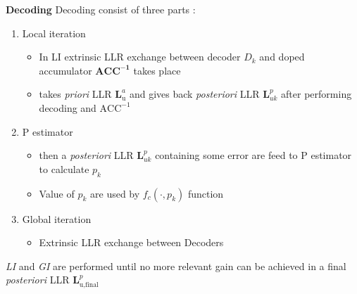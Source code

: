 \documentclass{beamer}
\providecommand{\brak}[1]{\ensuremath{\left(#1\right)}}
\begin{document}
\begin{frame}{\textbf{Decoding}}
    Decoding consist of three parts :
    \begin{enumerate}
        \item Local iteration
        \begin{itemize}
            \item In LI extrinsic LLR exchange between decoder $D_k$ and doped accumulator $\mathbf{\text{ACC}^{-1}}$ takes place
            \item takes \textit{priori} LLR $\mathbf{L}^{a}_{\text{u}}$
            and gives back  \textit{posteriori} LLR $\mathbf{L}^{p}_{u k}$ after performing decoding and $\text{ACC}^{-1}$
        \end{itemize}
        \item P estimator
        \begin{itemize}
            \item then a \textit{posteriori} LLR $\mathbf{L}^{p}_{u k}$ containing some error are feed to P estimator to calculate $p_k$
            \item Value of $p_k$ are used by $f_c\brak{\cdot,p_k}$ function
        \end{itemize}
        \item Global iteration
        \begin{itemize}
            \item Extrinsic LLR exchange between Decoders
        \end{itemize}
    \end{enumerate}
    
    \textit{LI} and \textit{GI} are performed until no more relevant gain can be achieved in a final \textit{posteriori} LLR $\mathbf{L}^{p}_{\text{u,final}}$
\end{frame}
\end{document}
